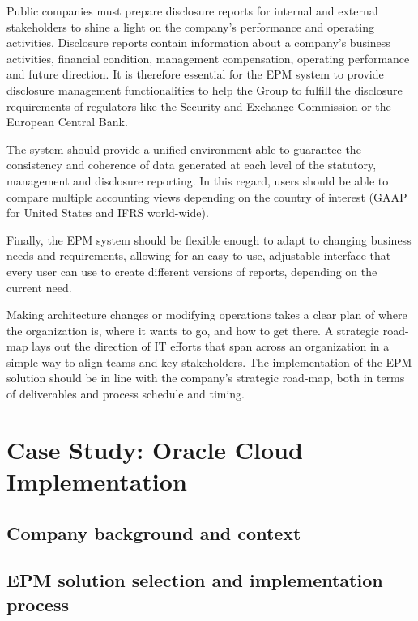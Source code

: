 \documentclass[12pt,a4paper,openright,twoside]{book}
\begin{document}
Public companies must prepare disclosure reports for internal and external stakeholders to shine a light on the company's performance and operating activities.
%
Disclosure reports contain information about a company's business activities, financial condition, management compensation, operating performance and future direction. 
%
It is therefore essential for the EPM system to provide disclosure management functionalities to help the Group to fulfill the disclosure requirements of regulators like the Security and Exchange Commission or the European Central Bank.

The system should provide  a unified environment able to guarantee the consistency and coherence of data generated at each level of the statutory, management and disclosure reporting.
%
In this regard, users should be able to compare multiple accounting views depending on the country of interest (GAAP for United States and IFRS world-wide).

Finally, the EPM system should be flexible enough to adapt to changing business needs and requirements, allowing for an easy-to-use, adjustable interface that every user can use to create different versions of reports, depending on the current need.

Making architecture changes or modifying operations takes a clear plan of where the organization is, where it wants to go, and how to get there. 
%
A strategic road-map lays out the direction of IT efforts that span across an organization in a simple way to align teams and key stakeholders.
%
The implementation of the EPM solution should be in line with the company's strategic road-map, both in terms of deliverables and process schedule and timing.

\chapter{Case Study: Oracle Cloud Implementation}
\label{chap:implementation}

\section{Company background and context}


\section{EPM solution selection and implementation process}
\end{document}

